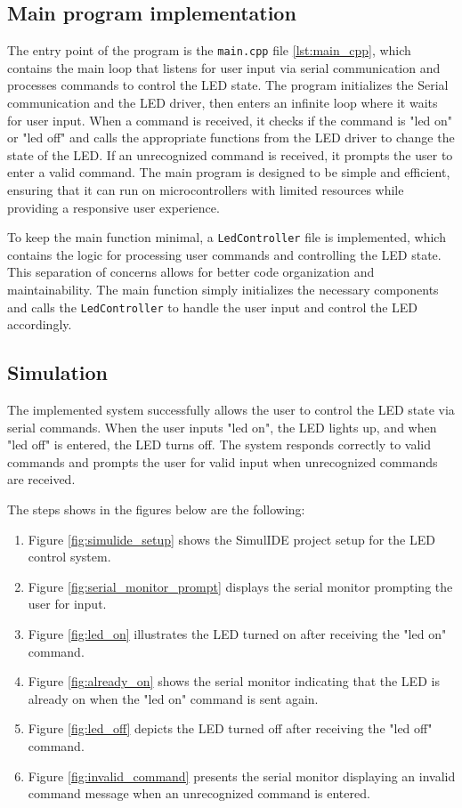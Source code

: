 \subsection{Main program implementation}

The entry point of the program is the \texttt{main.cpp} file \ref{lst:main_cpp}, which contains the main loop that listens for user input via serial communication and processes commands to control the LED state. The program initializes the Serial communication and the LED driver, then enters an infinite loop where it waits for user input. When a command is received, it checks if the command is "led on" or "led off" and calls the appropriate functions from the LED driver to change the state of the LED. If an unrecognized command is received, it prompts the user to enter a valid command. The main program is designed to be simple and efficient, ensuring that it can run on microcontrollers with limited resources while providing a responsive user experience.

To keep the main function minimal, a \texttt{LedController} file is implemented, which contains the logic for processing user commands and controlling the LED state. This separation of concerns allows for better code organization and maintainability. The main function simply initializes the necessary components and calls the \texttt{LedController} to handle the user input and control the LED accordingly.

\subsection{Simulation}

The implemented system successfully allows the user to control the LED state via serial commands. When the user inputs "led on", the LED lights up, and when "led off" is entered, the LED turns off. The system responds correctly to valid commands and prompts the user for valid input when unrecognized commands are received.

The steps shows in the figures below are the following:

\begin{enumerate}
    \item Figure \ref{fig:simulide_setup} shows the SimulIDE project setup for the LED control system.
    \item Figure \ref{fig:serial_monitor_prompt} displays the serial monitor prompting the user for input.
    \item Figure \ref{fig:led_on} illustrates the LED turned on after receiving the "led on" command.
    \item Figure \ref{fig:already_on} shows the serial monitor indicating that the LED is already on when the "led on" command is sent again.
    \item Figure \ref{fig:led_off} depicts the LED turned off after receiving the "led off" command.
    \item Figure \ref{fig:invalid_command} presents the serial monitor displaying an invalid command message when an unrecognized command is entered.
\end{enumerate}

